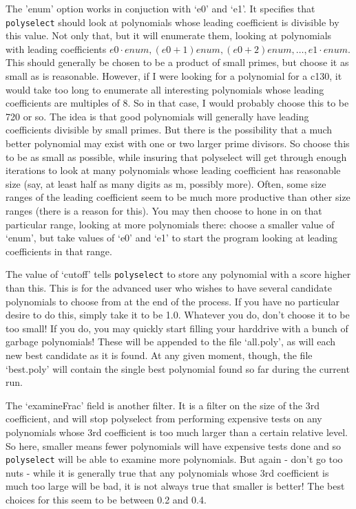 \documentclass[12pt]{article}
\begin{document}
  The 'enum' option works in conjuction with `e0' and `e1'.
  It specifies that {\tt polyselect} should look at polynomials
  whose leading coefficient is divisible by this value. Not only that, but
  it will enumerate them, looking at polynomials with leading coefficients
  $e0\cdot enum, (e0+1)enum, (e0+2)enum,\ldots, e1\cdot enum$.
  This should generally be chosen to be a product of small primes, but choose
  it as small as is reasonable. However, if I were looking for a polynomial for
  a c130, it would take too long to enumerate all interesting polynomials whose
  leading coefficients are multiples of 8. So in that case, I would probably
  choose this to be 720 or so.
  The idea is that good polynomials will generally have leading coefficients
  divisible by small primes. But there is the possibility that a much better
  polynomial may exist with one or two larger prime divisors. So choose this
  to be as small as possible, while insuring that polyselect will get through
  enough iterations to look at many polynomials whose leading coefficient
  has reasonable size (say, at least half as many digits as m, possibly more).
  Often, some size ranges of the leading coefficient seem to be much more productive
  than other size ranges (there is a reason for this). You may then choose to
  hone in on that particular range, looking at more polynomials there:
  choose a smaller value of `enum', but take values of `e0' and `e1' to start
  the program looking at leading coefficients in that range.

  The value of `cutoff' tells {\tt polyselect} to store any polynomial with a score
  higher than this. This is for the advanced user who wishes to have several
  candidate polynomials to choose from at the end of the process. If you have no
  particular desire to do this, simply take it to be 1.0. Whatever you do,
  don't choose it to be too small! If you do, you may quickly start filling your
  harddrive with a bunch of garbage polynomials! These will be appended to the
  file `all.poly', as will each new best candidate as it is found. At any given
  moment, though, the file `best.poly' will contain the single best polynomial
  found so far during the current run.

  The `examineFrac' field is another filter. It is a filter on the size of
  the 3rd coefficient, and will stop polyselect from performing expensive
  tests on any polynomials whose 3rd coefficient is too much larger than
  a certain relative level. So here, smaller means fewer polynomials will 
  have expensive tests done and so {\tt polyselect} will be able to examine
  more polynomials. But again - don't go too nuts - while it is generally
  true that any polynomials whose 3rd coefficient is much too large will
  be bad, it is not always true that smaller is better! The best choices
  for this seem to be between 0.2 and 0.4.
\end{document}
